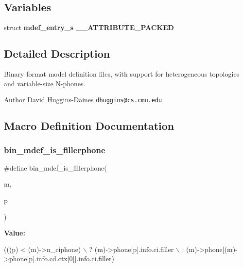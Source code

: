\subsection*{Variables}
\begin{DoxyCompactItemize}
\item 
\mbox{\label{bin__mdef_8h_ad0fdefd9aad4a31d730447b4711a8d89}} 
struct \textbf{ mdef\+\_\+entry\+\_\+s} {\bfseries \+\_\+\+\_\+\+A\+T\+T\+R\+I\+B\+U\+T\+E\+\_\+\+P\+A\+C\+K\+ED}
\end{DoxyCompactItemize}


\subsection{Detailed Description}
Binary format model definition files, with support for heterogeneous topologies and variable-\/size N-\/phones. 

\begin{DoxyAuthor}{Author}
David Huggins-\/\+Daines {\tt dhuggins@cs.\+cmu.\+edu} 
\end{DoxyAuthor}


\subsection{Macro Definition Documentation}
\mbox{\label{bin__mdef_8h_adaf0912c2d4c6039f8a47aef8c0cb281}} 
\subsubsection{bin\+\_\+mdef\+\_\+is\+\_\+fillerphone}
{\footnotesize\ttfamily \#define bin\+\_\+mdef\+\_\+is\+\_\+fillerphone(\begin{DoxyParamCaption}\item[{}]{m,  }\item[{}]{p }\end{DoxyParamCaption})}

{\bfseries Value\+:}
\begin{DoxyCode}
(((p) < (m)->n\_ciphone) \(\backslash\)
                                         ? (m)->phone[p].info.ci.filler \(\backslash\)
                                         : (m)->phone[(m)->phone[p].info.cd.ctx[0]].info.ci.filler)
\end{DoxyCode}


